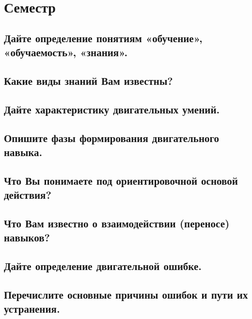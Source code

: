 \section{Семестр}

\subsection{Дайте определение понятиям «обучение», «обучаемость», «знания».}



\subsection{Какие виды знаний Вам известны?}



\subsection{Дайте характеристику двигательных умений.}



\subsection{Опишите фазы формирования двигательного навыка.}



\subsection{Что Вы понимаете под ориентировочной основой действия?}



\subsection{Что Вам известно о взаимодействии (переносе) навыков?}



\subsection{Дайте определение двигательной ошибке.}



\subsection{Перечислите основные причины ошибок и пути их устранения.}



